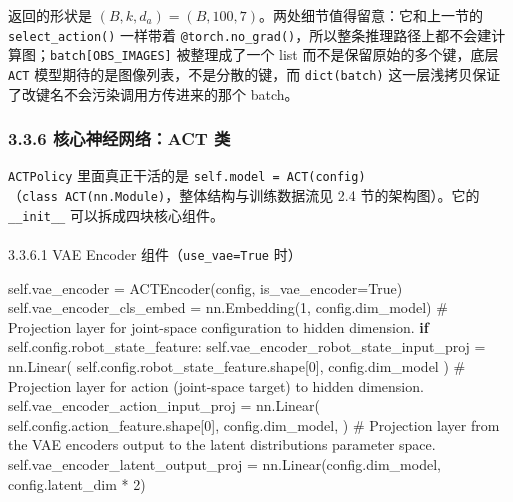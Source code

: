 \documentclass[
  chinese,
]{ctexart}
\makeatletter
\let\oldparagraph\paragraph
\renewcommand{\paragraph}{
    \@ifstar
      \xxxParagraphStar
      \xxxParagraphNoStar
  }
\newcommand{\xxxParagraphStar}[1]{\oldparagraph*{#1}\mbox{}}
\newcommand{\xxxParagraphNoStar}[1]{\oldparagraph{#1}\mbox{}}
\newenvironment{Shaded}{\begin{snugshade}}{\end{snugshade}}
\newcommand{\CommentTok}[1]{\textcolor[rgb]{0.37,0.37,0.37}{#1}}
\newcommand{\ControlFlowTok}[1]{\textcolor[rgb]{0.00,0.23,0.31}{\textbf{#1}}}
\newcommand{\DecValTok}[1]{\textcolor[rgb]{0.68,0.00,0.00}{#1}}
\newcommand{\NormalTok}[1]{\textcolor[rgb]{0.00,0.23,0.31}{#1}}
\newcommand{\OperatorTok}[1]{\textcolor[rgb]{0.37,0.37,0.37}{#1}}
\newcommand{\VariableTok}[1]{\textcolor[rgb]{0.07,0.07,0.07}{#1}}
\makeatother
\begin{document}
返回的形状是
\((B, k, d_a) = (B, 100, 7)\)。两处细节值得留意：它和上一节的
\texttt{select\_action()} 一样带着
\texttt{@torch.no\_grad()}，所以整条推理路径上都不会建计算图；\texttt{batch{[}OBS\_IMAGES{]}}
被整理成了一个 list 而不是保留原始的多个键，底层 \texttt{ACT}
模型期待的是图像列表，不是分散的键，而 \texttt{dict(batch)}
这一层浅拷贝保证了改键名不会污染调用方传进来的那个 batch。

\subsubsection{3.3.6 核心神经网络：ACT
类}\label{ux6838ux5fc3ux795eux7ecfux7f51ux7edcact-ux7c7b}

\texttt{ACTPolicy} 里面真正干活的是
\texttt{self.model\ =\ ACT(config)}（\texttt{class\ ACT(nn.Module)}，整体结构与训练数据流见
2.4 节的架构图）。它的 \texttt{\_\_init\_\_} 可以拆成四块核心组件。

\paragraph{\texorpdfstring{3.3.6.1 VAE Encoder
组件（\texttt{use\_vae=True}
时）}{3.3.6.1 VAE Encoder 组件（use\_vae=True 时）}}\label{vae-encoder-ux7ec4ux4ef6use_vaetrue-ux65f6}

\begin{Shaded}
\begin{Highlighting}[]
\VariableTok{self}\NormalTok{.vae\_encoder }\OperatorTok{=}\NormalTok{ ACTEncoder(config, is\_vae\_encoder}\OperatorTok{=}\VariableTok{True}\NormalTok{)}
\VariableTok{self}\NormalTok{.vae\_encoder\_cls\_embed }\OperatorTok{=}\NormalTok{ nn.Embedding(}\DecValTok{1}\NormalTok{, config.dim\_model)}
\CommentTok{\# Projection layer for joint{-}space configuration to hidden dimension.}
\ControlFlowTok{if} \VariableTok{self}\NormalTok{.config.robot\_state\_feature:}
    \VariableTok{self}\NormalTok{.vae\_encoder\_robot\_state\_input\_proj }\OperatorTok{=}\NormalTok{ nn.Linear(}
        \VariableTok{self}\NormalTok{.config.robot\_state\_feature.shape[}\DecValTok{0}\NormalTok{], config.dim\_model}
\NormalTok{    )}
\CommentTok{\# Projection layer for action (joint{-}space target) to hidden dimension.}
\VariableTok{self}\NormalTok{.vae\_encoder\_action\_input\_proj }\OperatorTok{=}\NormalTok{ nn.Linear(}
    \VariableTok{self}\NormalTok{.config.action\_feature.shape[}\DecValTok{0}\NormalTok{],}
\NormalTok{    config.dim\_model,}
\NormalTok{)}
\CommentTok{\# Projection layer from the VAE encoder\textquotesingle{}s output to the latent distribution\textquotesingle{}s parameter space.}
\VariableTok{self}\NormalTok{.vae\_encoder\_latent\_output\_proj }\OperatorTok{=}\NormalTok{ nn.Linear(config.dim\_model, config.latent\_dim }\OperatorTok{*} \DecValTok{2}\NormalTok{)}
\end{Highlighting}
\end{Shaded}
\end{document}
